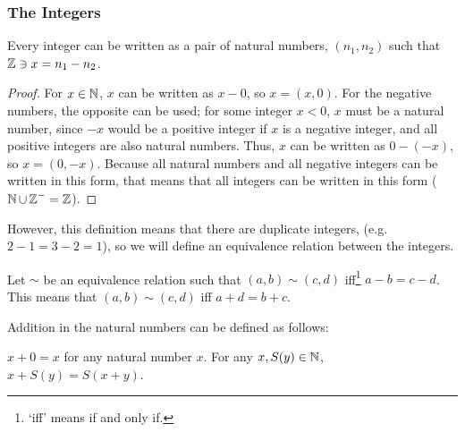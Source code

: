         \subsubsection{The Integers}
            Every integer can be written as a pair of natural numbers, $(n_1,n_2)$ such that $\operatorname{\mathbb{Z}}\ni x=n_1-n_2$.
            \begin{proof}
                For $x\in\operatorname{\mathbb{N}}$, $x$ can be written as $x-0$, so $x=(x,0)$.
                For the negative numbers, the opposite can be used; for some integer $x<0$, $x$ must be a natural number, since $-x$ would be a positive integer if $x$ is a negative integer, and all positive integers are also natural numbers.
                Thus, $x$ can be written as $0-(-x)$, so $x=(0,-x)$.
                Because all natural numbers and all negative integers can be written in this form, that means that all integers can be written in this form ($\operatorname{\mathbb{N}}\cup\operatorname{\mathbb{Z}}^-=\operatorname{\mathbb{Z}}$).
            \end{proof}
            However, this definition means that there are duplicate integers, (e.g. $2-1=3-2=1$), so we will define an equivalence relation between the integers.
            
            Let $\sim$ be an equivalence relation such that $(a,b)\sim(c,d)$ iff\footnote{`iff' means if and only if.} $a-b=c-d$.
            This means that $(a,b)\sim(c,d)$ iff $a+d=b+c$.
            
            Addition in the natural numbers can be defined as follows:

            $x+0=x$ for any natural number $x$.
            For any $x,S(y)\in\operatorname{\mathbb{N}}$, $x+S(y)=S(x+y)$.

